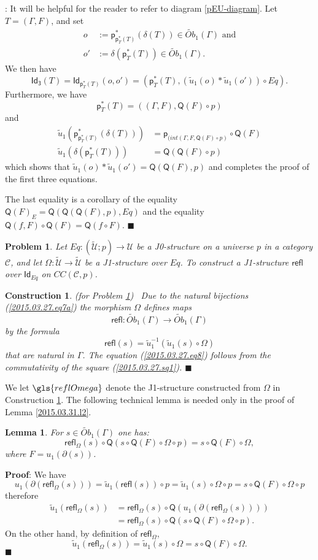 \documentclass[12pt]{article}
\numberwithin{equation}{section}
\newenvironment{myproof}{{\bf Proof}:}{$\blacksquare$ \vskip 5mm }
\newtheorem{lemma}[proposition]{Lemma}
\newtheorem{problem}[proposition]{Problem}
\newtheorem{construction0}[proposition]{Construction}
\newenvironment{construction}[1]{\begin{construction0}(for Problem \ref{#1})\ }{$\blacksquare$ \end{construction0}}
\newcommand{\sr}{\rightarrow}
\newcommand{\wt}{\widetilde}
\newcommand{\toCC}{CC} %
\newcommand{\C}{{\mathcal C}}  %
\newcommand{\p}{\mathsf{p}}
\newcommand{\Id}{\mathsf{Id}} %
\newcommand{\Idx}{\mathsf{Id_3}} %
\newcommand{\refl}{\mathsf{refl}}
\newcommand{\U}{\mathcal{U}}
\newcommand{\Q}{\mathsf{Q}}
\newcommand{\Obwt}{\wt{Ob}}
\begin{document}
%
\begin{myproof}
It will be helpful for the reader to refer to diagram \ref{pEU-diagram}.
Let $T=(\Gamma,F)$, and set
\begin{align*}
  o &:=\p_{\p_T^*(T)}^*(\delta(T)) \in \Obwt_1(\Gamma) \text{ and}\\
  o'&:=\delta(\p_T^*(T)) \in \Obwt_1(\Gamma) .
\end{align*}
We then have
%
$$\Idx(T)=\Id_{\p_T^*(T)}(o,o')= (\p_T^*(T), (\wt{u}_1(o)*\wt{u}_1(o')) \circ Eq).$$
%
%
%
Furthermore, we have
%
$$\p_T^*(T) =((\Gamma,F),\Q(F)\circ p)$$
%
and
%
\begin{align*}
  \wt{u}_1(\p_{\p_T^*(T)}^*(\delta(T)))&=\p_{(int(\Gamma,F, \Q(F)\circ p)}\circ \Q(F) \\
  \wt{u}_1(\delta(\p_T^*(T)))&=\Q(\Q(F)\circ p)
\end{align*}
%
which shows that $\wt{u}_1(o)*\wt{u}_1(o')=\Q(\Q(F),p)$ and completes the proof
of the first three equations.

The last equality is a corollary of the equality $\Q(F)_{E}=\Q(\Q(\Q(F),p),Eq)$
and the equality $\Q(f,F)\circ \Q(F)=\Q(f\circ F)$.
\end{myproof}
%
\begin{problem}
\label{2015.03.27.prob4} Let $Eq:(\wt{\U};p)\sr \U$
be a J0-structure on a universe $p$ in a category $\C$,
and let $\Omega:\wt{\U}\sr \wt{\U}$ be a J1-structure over $Eq$.
To construct a J1-structure $\refl$ over $\Id_{Eq}$ on $\toCC({\C},p)$.
\end{problem}
%
\begin{construction}{2015.03.27.prob4}\rm
\label{2015.03.27.constr4} Due to the natural bijections
(\ref{2015.03.27.eq7a}) the morphism $\Omega$ defines maps
%
$$\refl:\Obwt_1(\Gamma)\sr \Obwt_1(\Gamma)$$
%
by the formula
%
$$\refl(s)=\wt{u}_1^{-1}(\wt{u}_1(s)\circ \Omega)$$
%
that are natural in $\Gamma$. The equation (\ref{2015.03.27.eq8}) follows from
the commutativity of the square (\ref{2015.03.27.sq1}).
\end{construction}
%
We let $\gls{reflOmega}$ denote the J1-structure constructed from $\Omega$ in
Construction \ref{2015.03.27.constr4}.
%
The following technical lemma is needed only in the proof of Lemma
\ref{2015.03.31.l2}.
%
\begin{lemma}
\label{2015.04.02.l3} For $s\in \Obwt_1(\Gamma)$ one has:
%
$$\refl_{\Omega}(s)\circ \Q(s\circ \Q(F)\circ \Omega\circ p)=s\circ \Q(F)\circ
\Omega,$$
%
where $F=u_1(\partial(s))$.
\end{lemma}
%
\begin{myproof}
We have
%
$$u_1(\partial(\refl_{\Omega}(s)))=\wt{u}_1(\refl(s))\circ p=\wt{u}_1(s)\circ
\Omega\circ p=s\circ \Q(F)\circ \Omega\circ p$$
%
therefore
%
\begin{align*}
  \wt{u}_1(\refl_{\Omega}(s))
  & =\refl_{\Omega}(s)\circ \Q(u_1(\partial(\refl_{\Omega}(s)))) \\
  & = \refl_{\Omega}(s)\circ \Q(s\circ \Q(F)\circ \Omega\circ p).
\end{align*}
%
On the other hand, by definition of $\refl_{\Omega}$,
%
$$\wt{u}_1(\refl_{\Omega}(s))=\wt{u}_1(s)\circ \Omega=s\circ \Q(F)\circ \Omega.$$
%
\end{myproof}
\end{document}
